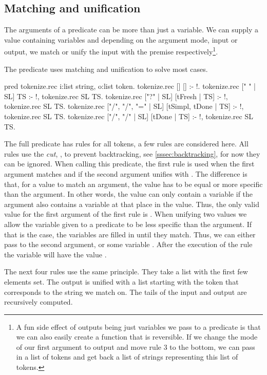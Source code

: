 \documentclass[thesis.tex]{subfiles}
\begin{document}
{{\subsection{Matching and unification}\label{sssec:mandu}
The arguments of a predicate can be more than just a variable. We can supply a value containing variables and depending on the argument mode, input or output, we match or unify the input with the premise respectively\footnote{A fun side effect of outputs being just variables we pass to a predicate is that we can also easily create a function that is reversible. If we change the mode of our first argument to output and move rule 3 to the bottom, we can pass in a list of tokens and get back a list of strings representing this list of tokens.}.

The predicate  uses matching and unification to solve most cases.
\begin{elpicode}
  pred tokenize.rec i:list string, o:list token.
  tokenize.rec [] [] :- !.
  tokenize.rec [" " | SL] TS :- !, tokenize.rec SL TS.
  tokenize.rec ["?" | SL] [tFresh | TS] :- !, 
    tokenize.rec SL TS.
  tokenize.rec ["/", "/", "=" | SL] 
               [tSimpl, tDone | TS] :- !, 
    tokenize.rec SL TS.
  tokenize.rec ["/", "/" | SL] [tDone | TS] :- !, 
    tokenize.rec SL TS.
\end{elpicode}
The full predicate has rules for all tokens, a few rules are considered here. All rules  use the \emph{cut}, \elpii{!}, to prevent backtracking, see \cref{sssec:backtracking}, for now they can be ignored. When calling this predicate, the first rule is used when the first argument matches \elpii{[]} and if the second argument unifies with \elpii{[]}. The difference is that, for a value to match an argument, the value has to be equal or more specific than the argument. In other words, the value can only contain a variable if the argument also contains a variable at that place in the value. Thus, the only valid value for the first argument of the first rule is \elpii{[]}. When unifying two values we allow the variable given to a predicate to be less specific than the argument. If that is the case, the variables are filled in until they match. Thus, we can either pass \elpii{[]} to the second argument, or some variable . After the execution of the rule the variable  will have the value \elpii{[]}.

The next four rules use the same principle. They take a list with the first few elements set. The output is unified with a list starting with the token that corresponds to the string we match on. The tails of the input and output are recursively computed.

}}
\end{document}
